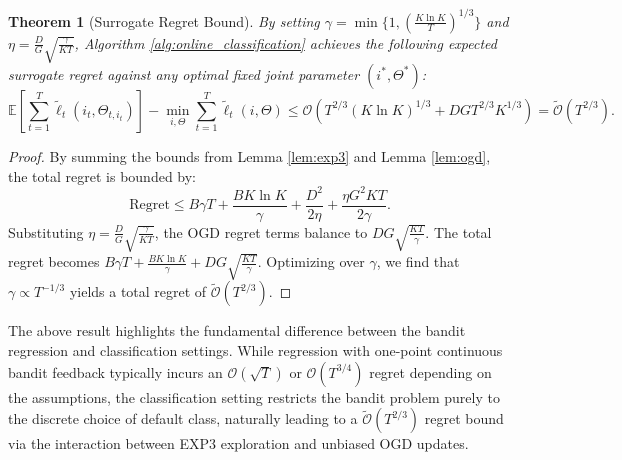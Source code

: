 \documentclass[11pt]{article}
\newtheorem{theorem}{Theorem}
\begin{document}
\begin{theorem}[Surrogate Regret Bound]
By setting $\gamma = \min\{1, \left(\frac{K \ln K}{T}\right)^{1/3}\}$ and $\eta = \frac{D}{G} \sqrt{\frac{\gamma}{K T}}$, Algorithm \ref{alg:online_classification} achieves the following expected surrogate regret against any optimal fixed joint parameter $(i^*, \Theta^*)$:
\begin{equation}
    \mathbb{E}\left[ \sum_{t=1}^T \tilde{\ell}_t(i_t, \Theta_{t, i_t}) \right] - \min_{i, \Theta} \sum_{t=1}^T \tilde{\ell}_t(i, \Theta) \le \mathcal{O}\left(T^{2/3} (K \ln K)^{1/3} + D G T^{2/3} K^{1/3}\right) = \tilde{\mathcal{O}}(T^{2/3}).
\end{equation}
\end{theorem}
\begin{proof}
By summing the bounds from Lemma \ref{lem:exp3} and Lemma \ref{lem:ogd}, the total regret is bounded by:
$$ \text{Regret} \le B \gamma T + \frac{B K \ln K}{\gamma} + \frac{D^2}{2\eta} + \frac{\eta G^2 K T}{2 \gamma}. $$
Substituting $\eta = \frac{D}{G} \sqrt{\frac{\gamma}{K T}}$, the OGD regret terms balance to $D G \sqrt{\frac{K T}{\gamma}}$. The total regret becomes $B \gamma T + \frac{B K \ln K}{\gamma} + D G \sqrt{\frac{K T}{\gamma}}$.
Optimizing over $\gamma$, we find that $\gamma \propto T^{-1/3}$ yields a total regret of $\tilde{\mathcal{O}}(T^{2/3})$.
\end{proof}

The above result highlights the fundamental difference between the bandit regression and classification settings. While regression with one-point continuous bandit feedback typically incurs an $\mathcal{O}(\sqrt{T})$ or $\mathcal{O}(T^{3/4})$ regret depending on the assumptions, the classification setting restricts the bandit problem purely to the discrete choice of default class, naturally leading to a $\tilde{\mathcal{O}}(T^{2/3})$ regret bound via the interaction between EXP3 exploration and unbiased OGD updates.
\end{document}
